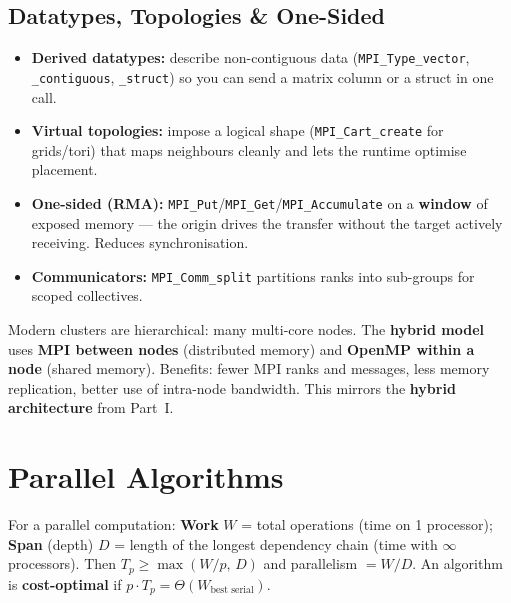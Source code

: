 \documentclass[11pt,a4paper]{article}
\begin{document}
\subsection{Datatypes, Topologies \& One-Sided}
\begin{itemize}[leftmargin=*, itemsep=2pt]
  \item \textbf{Derived datatypes:} describe non-contiguous data (\texttt{MPI\_Type\_vector}, \texttt{\_contiguous}, \texttt{\_struct}) so you can send a matrix column or a struct in one call.
  \item \textbf{Virtual topologies:} impose a logical shape (\texttt{MPI\_Cart\_create} for grids/tori) that maps neighbours cleanly and lets the runtime optimise placement.
  \item \textbf{One-sided (RMA):} \texttt{MPI\_Put}/\texttt{MPI\_Get}/\texttt{MPI\_Accumulate} on a \textbf{window} of exposed memory --- the origin drives the transfer without the target actively receiving. Reduces synchronisation.
  \item \textbf{Communicators:} \texttt{MPI\_Comm\_split} partitions ranks into sub-groups for scoped collectives.
\end{itemize}

\begin{conceptbox}
Modern clusters are hierarchical: many multi-core nodes. The \textbf{hybrid model} uses \textbf{MPI between nodes} (distributed memory) and \textbf{OpenMP within a node} (shared memory). Benefits: fewer MPI ranks and messages, less memory replication, better use of intra-node bandwidth. This mirrors the \textbf{hybrid architecture} from Part~I.
\end{conceptbox}

\section{Parallel Algorithms}

\begin{definitionbox}
For a parallel computation: \textbf{Work} $W$ = total operations (time on 1 processor); \textbf{Span} (depth) $D$ = length of the longest dependency chain (time with $\infty$ processors). Then $T_p \ge \max(W/p,\, D)$ and parallelism $=W/D$. An algorithm is \textbf{cost-optimal} if $p \cdot T_p = \Theta(W_{\text{best serial}})$.
\end{definitionbox}
\end{document}
